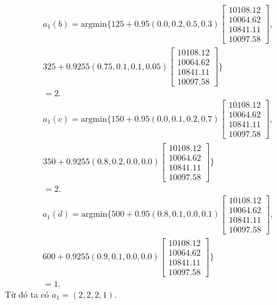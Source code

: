 \documentclass[12pt,a4paper]{report}
\begin{document}
  \begin{align*}
  a_1(b)=\mathrm{argmin}\{125+0.95(0.0,0.2,0.5,0.3)
  \left[
  \begin{array}{c}
 10108.12\\
10064.62\\
10841.11\\
10097.58
  \end{array}
  \right],\\
  325+0.9255(0.75,0.1,0.1,0.05)
  \left[
  \begin{array}{c}
  10108.12\\
 10064.62\\
 10841.11\\
 10097.58
  \end{array}
  \right]\}\\
  =2.
  \end{align*}
  \begin{align*}
  a_1(c)=\mathrm{argmin}\{150+0.95(0.0,0.1,0.2,0.7)
  \left[
  \begin{array}{c}
 10108.12\\
10064.62\\
10841.11\\
10097.58
  \end{array}
  \right],\\
  350+0.9255(0.8,0.2,0.0,0.0)
  \left[
  \begin{array}{c}
 10108.12\\
10064.62\\
10841.11\\
10097.58
  \end{array}
  \right]\}\\
  =2.
  \end{align*}
  \begin{align*}
  a_1(d)=\mathrm{argmin}\{500+0.95(0.8,0.1,0.0,0.1)
  \left[
  \begin{array}{c}
 10108.12\\
10064.62\\
10841.11\\
10097.58
  \end{array}
  \right],\\
  600+0.9255(0.9,0.1,0.0,0.0)
  \left[
  \begin{array}{c}
   10108.12\\
  10064.62\\
  10841.11\\
  10097.58
  \end{array}
  \right]\}\\
  =1.
  \end{align*}
  Từ đó ta có $a_1=(2,2,2,1)$.
  
\end{document}
